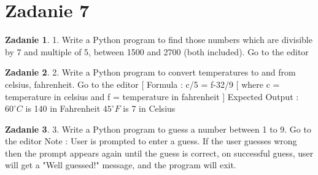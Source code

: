 \documentclass[11pt]{article}
\theoremstyle{definition}
\newtheorem{zadanie}{Zadanie}
\begin{document}
%
%
%
%
%
%
%
%

\section{Zadanie 7}

\begin{zadanie}

1. Write a Python program to find those numbers which are divisible by 7 and multiple of 5, between 1500 and 2700 (both included). Go to the editor


\end{zadanie}

\begin{zadanie}


2. Write a Python program to convert temperatures to and from celsius, fahrenheit. Go to the editor
[ Formula : c/5 = f-32/9 [ where c = temperature in celsius and f = temperature in fahrenheit ]
Expected Output :
$60^\circ C$ is 140 in Fahrenheit
$45^\circ F$ is 7 in Celsius


\end{zadanie}

\begin{zadanie}


3. Write a Python program to guess a number between 1 to 9. Go to the editor
Note : User is prompted to enter a guess. If the user guesses wrong then the prompt appears again until the guess is correct, on successful guess, user will get a "Well guessed!" message, and the program will exit.


\end{zadanie}
\end{document}
